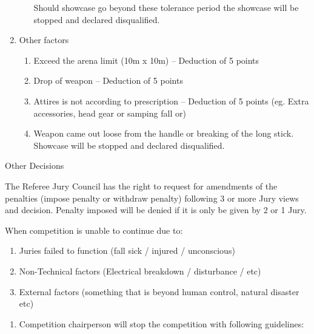 \begin{legal}
\begin{legal}
\begin{legal}
\begin{enumerate}[label=\alph*.]
\begin{enumerate}[label*=\arabic*.]
                    Should showcase go beyond these tolerance period the showcase will be stopped and 
                    declared disqualified.
                \end{enumerate}


            \item Other factors
                \begin{enumerate}[label*=\arabic*.]
                \item Exceed the arena limit (10m x 10m) – Deduction of 5 points
                \item Drop of weapon – Deduction of 5 points
                \item Attires is not according to prescription – Deduction of 5 points 
                (eg. Extra accessories, head gear or samping fall or)
                \item \label{pt:tunggal_loose_weapon} Weapon came out loose from the handle or breaking of the long stick. 
                Showcase will be stopped and declared disqualified.
                \end{enumerate}
            \end{enumerate}

        \end{legal}

        \item Other Decisions
            \begin{legal}
            \item The Referee Jury Council has the right to request for amendments of the penalties 
            (impose penalty or withdraw penalty) following 3 or more Jury views and decision. Penalty imposed will be denied if it is only be given by 2 or 1 Jury.
            \item When competition is unable to continue due to:
                \begin{enumerate}[label*=\roman*.]
                \item Juries failed to function (fall sick / injured / unconscious)
                \item Non-Technical factors (Electrical breakdown / disturbance / etc)
                \item External factors (something that is beyond human control, natural disaster etc)

                \end{enumerate}

                \begin{enumerate}[label*=\alph*.]
                    \item Competition chairperson will stop the competition with following guidelines:


\end{enumerate}
\end{legal}
\end{legal}
\end{legal}
